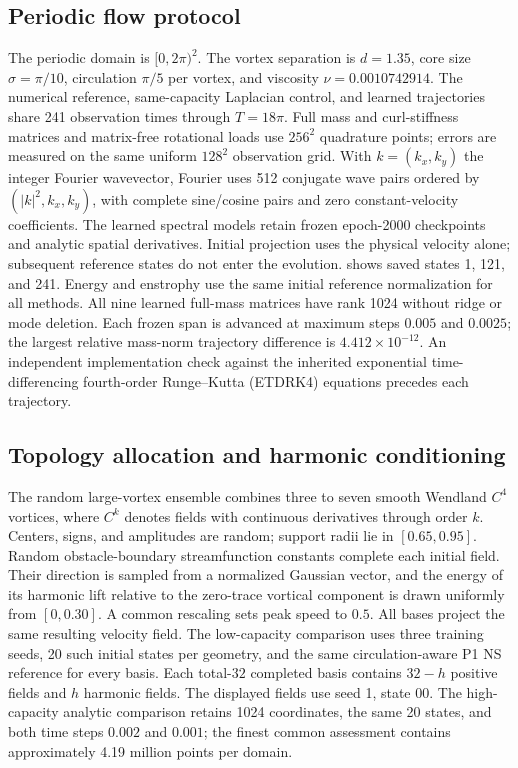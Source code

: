 \subsection{Periodic flow protocol}
The periodic domain is $[0,2\pi)^2$. The vortex separation is $d=1.35$, core size $\sigma=\pi/10$, circulation $\pi/5$ per vortex, and viscosity $\nu=0.0010742914$. The numerical reference, same-capacity Laplacian control, and learned trajectories share 241 observation times through $T=18\pi$. Full mass and curl-stiffness matrices and matrix-free rotational loads use $256^2$ quadrature points; errors are measured on the same uniform $128^2$ observation grid. With $k=(k_x,k_y)$ the integer Fourier wavevector, Fourier uses 512 conjugate wave pairs ordered by $(|k|^2,k_x,k_y)$, with complete sine/cosine pairs and zero constant-velocity coefficients. The learned spectral models retain frozen epoch-2000 checkpoints and analytic spatial derivatives. Initial projection uses the physical velocity alone; subsequent reference states do not enter the evolution.  shows saved states 1, 121, and 241. Energy and enstrophy use the same initial reference normalization for all methods.
All nine learned full-mass matrices have rank 1024 without ridge or mode deletion. Each frozen span is advanced at maximum steps $0.005$ and $0.0025$; the largest relative mass-norm trajectory difference is $4.412\times10^{-12}$. An independent implementation check against the inherited exponential time-differencing fourth-order Runge--Kutta (ETDRK4) equations {\citep{cox2002exponential,kassam2005fourth}} precedes each trajectory.

\subsection{Topology allocation and harmonic conditioning}
The random large-vortex ensemble combines three to seven smooth Wendland $C^4$ vortices, where $C^k$ denotes fields with continuous derivatives through order $k$. Centers, signs, and amplitudes are random; support radii lie in $[0.65,0.95]$. Random obstacle-boundary streamfunction constants complete each initial field. Their direction is sampled from a normalized Gaussian vector, and the energy of its harmonic lift relative to the zero-trace vortical component is drawn uniformly from $[0,0.30]$. A common rescaling sets peak speed to $0.5$. All bases project the same resulting velocity field. The low-capacity comparison uses three training seeds, 20 such initial states per geometry, and the same circulation-aware P1 NS reference for every basis. Each total-$32$ completed basis contains $32-h$ positive fields and $h$ harmonic fields. The displayed fields use seed 1, state 00. The high-capacity analytic comparison retains 1024 coordinates, the same 20 states, and both time steps $0.002$ and $0.001$; the finest common assessment contains approximately 4.19 million points per domain.

